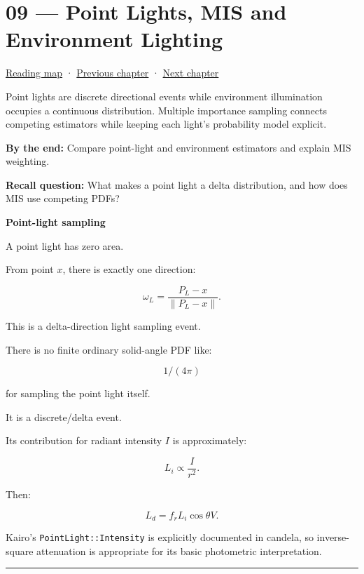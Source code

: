 \hypertarget{03-visual-computing-i-ch009}{}
\chapter{09 --- Point Lights, MIS and Environment Lighting}\label{03-visual-computing-i-ch009-point-lights-mis-and-environment-lighting}

\hyperref[volume-reading-map]{Reading map} · \hyperref[03-visual-computing-i-ch008-sampling-directions-and-light-transport]{Previous chapter} · \hyperref[03-visual-computing-i-ch010-a-production-path-tracer-media-randomness-and-validation]{Next chapter}

Point lights are discrete directional events while environment illumination occupies a continuous distribution. Multiple importance sampling connects competing estimators while keeping each light's probability model explicit.

\textbf{By the end:} Compare point-light and environment estimators and explain MIS weighting.

\textbf{Recall question:} What makes a point light a delta distribution, and how does MIS use competing PDFs?

\textbf{Point-light sampling}

A point light has zero area.

From point \(x\), there is exactly one direction:

\[
\omega_L
=
\frac{
P_L-x
}{
\|P_L-x\|
}.
\]

This is a delta-direction light sampling event.

There is no finite ordinary solid-angle PDF like:

\[
1/(4\pi)
\]

for sampling the point light itself.

It is a discrete/delta event.

Its contribution for radiant intensity \(I\) is approximately:

\[
L_i
\propto
\frac{
I
}{
r^2
}.
\]

Then:

\[
L_d
=
f_r
L_i
\cos\theta
V.
\]

Kairo's \texttt{PointLight::Intensity} is explicitly documented in candela, so inverse-square attenuation is appropriate for its basic photometric interpretation.

\begin{center}\rule{0.5\linewidth}{0.5pt}\end{center}

